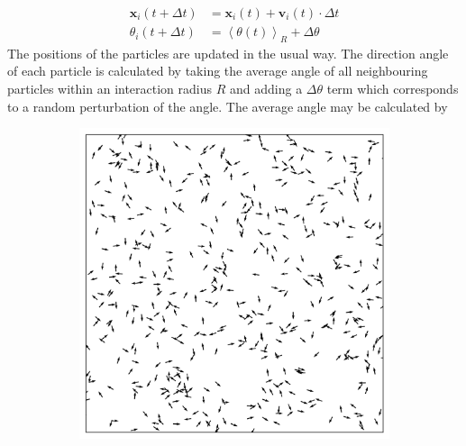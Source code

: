 \documentclass[%
11pt,
amsmath, amssymb,
aps,
pra
]{revtex4-2}
\newcommand{\threeImageSpacing}{0.25\textwidth}
\begin{document}
\begin{align}
    \mathbf{x}_i(t + \Delta t) &= \mathbf{x}_i(t) + \mathbf{v}_i(t) \cdot \Delta t \\
    \theta_i(t + \Delta t) &= \left\langle \theta(t) \right\rangle _R + \Delta\theta 
\end{align}
The positions of the particles are updated in the usual way. The direction angle of each particle is calculated by taking the average
angle of all neighbouring particles within an interaction radius \(R\) and adding a \(\Delta\theta\) term which corresponds to a random perturbation of the angle.
The average angle may be calculated by 
\begin{figure}[t]
    \centering
    \begin{subfigure}{\threeImageSpacing}
        \includegraphics[width=\linewidth]{images/vicsek/VicsekZero.png}
    \end{subfigure}
    \begin{subfigure}{\threeImageSpacing}

\end{subfigure}
\end{figure}
\end{document}
